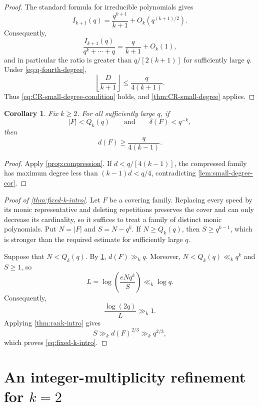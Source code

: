 \documentclass[11pt,reqno]{amsart}
\numberwithin{equation}{section}
\newtheorem{corollary}[corollary]{Corollary}
\theoremstyle{definition}
\theoremstyle{remark}
\newcommand{\cF}{\mathcal F}
\newcommand{\abs}[1]{\lvert#1\rvert}
\def\mathcal#1{#1}%
\begin{document}
\begin{proof}
The standard formula for irreducible polynomials gives
\[
 I_{k+1}(q)
 =\frac{q^{k+1}}{k+1}
 +O_k(q^{(k+1)/2}).
\]
Consequently,
\[
 \frac{I_{k+1}(q)}{q^k+\cdots+q}
 =\frac q{k+1}+O_k(1),
\]
and in particular the ratio is greater than
$q/[2(k+1)]$ for sufficiently large $q$.  Under
\eqref{eq:q-fourth-degree},
\[
 \left\lfloor\frac D{k+1}\right\rfloor
 \le\frac q{4(k+1)}.
\]
Thus \eqref{eq:CR-small-degree-condition} holds, and
\cref{thm:CR-small-degree} applies.
\end{proof}

\begin{corollary}\label{cor:rank-lower}
Fix $k\ge2$.  For all sufficiently large $q$, if
\[
 \abs{\cF}<Q_k(q)
 \qquad\text{and}\qquad
 \delta(\cF)<q^{-k},
\]
then
\begin{equation}\label{eq:rank-lower}
 d(\cF)\ge\frac{q}{4(k-1)}.
\end{equation}
\end{corollary}

\begin{proof}
Apply \cref{prop:compression}.  If
$d<q/[4(k-1)]$, the compressed family has maximum degree less than
$(k-1)d<q/4$, contradicting \cref{lem:small-degree-cor}.
\end{proof}

\begin{proof}[Proof of \cref{thm:fixed-k-intro}]
Let $\cF$ be a covering family.  Replacing every speed by its monic representative and deleting repetitions preserves the cover and can only decrease its cardinality, so it suffices to treat a family of distinct monic polynomials.  Put
$N=\abs{\cF}$ and $S=N-q^k$.  If $N\ge Q_k(q)$, then
$S\ge q^{k-1}$, which is stronger than the required estimate for sufficiently large $q$.

Suppose that $N<Q_k(q)$.  By \cref{cor:rank-lower},
$d(\cF)\gg_kq$.  Moreover,
$N<Q_k(q)\ll_kq^k$ and $S\ge1$, so
\[
 L=\log\left(\frac{eNq^k}{S}\right)
 \ll_k\log q.
\]
Consequently,
\[
 \frac{\log(2q)}{L}\gg_k1.
\]
Applying \cref{thm:rank-intro} gives
\[
 S\gg_k d(\cF)^{2/3}\gg_kq^{2/3},
\]
which proves \eqref{eq:fixed-k-intro}.
\end{proof}

\section{An integer-multiplicity refinement for \texorpdfstring{$k=2$}{k=2}}\label{sec:k2}
\end{document}
